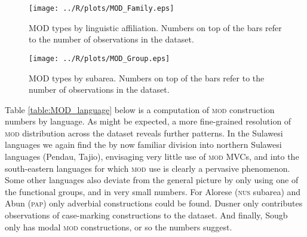\begin{figure}
\texttt{[image: ../R/plots/MOD\_Family.eps]}
\caption[MOD types by linguistic affiliation]{MOD types by linguistic affiliation. Numbers on top of the bars refer to the number of observations in the dataset.}\label{fig:mod-family}
\end{figure}
\begin{figure}
\texttt{[image: ../R/plots/MOD\_Group.eps]}
\caption[MOD types by subarea]{MOD types by subarea. Numbers on top of the bars refer to the number of observations in the dataset.}\label{fig:mod-group}
\end{figure}


Table \ref{table:MOD_language} below is a computation of \textsc{mod} construction numbers by language. As might be expected, a more fine-grained resolution of \textsc{mod} distribution across the dataset reveals further patterns. In the Sulawesi languages we again find the by now familiar division into northern Sulawesi languages (Pendau, Tajio), envisaging very little use of \textsc{mod} MVCs, and into the south-eastern languages for which \textsc{mod} use is clearly a pervasive phenomenon. Some other languages also deviate from the general picture by only using one of the functional groups, and in very small numbers. For Alorese (\textsc{nus} subarea) and Abun (\textsc{pap}) only adverbial constructions could be found. Dusner only contributes observations of case-marking constructions to the dataset. And finally, Sougb only has modal \textsc{mod} constructions, or so the numbers suggest.

